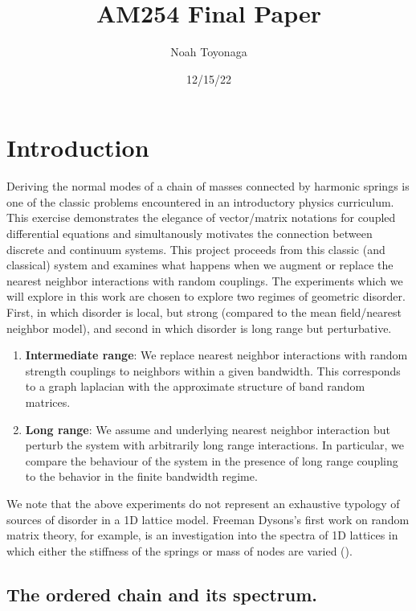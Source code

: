 \documentclass{article}
\title{AM254 Final Paper}
\author{Noah Toyonaga}
\date{12/15/22}
\begin{document}
\maketitle


\section{Introduction}
Deriving the normal modes of a chain of masses connected by harmonic springs is one of the 
classic problems encountered in an introductory physics curriculum.
This exercise demonstrates the elegance of 
vector/matrix notations for coupled differential equations 
and simultanously motivates the connection between discrete and continuum systems. 
This project proceeds from this classic (and classical) system
and examines what happens when we augment or replace the nearest neighbor interactions with random couplings. 
The experiments which we will explore in this work are chosen to explore two regimes of geometric disorder. 
First, in which disorder is local, but strong (compared to the mean field/nearest neighbor model), and second in which disorder is long range but perturbative. 

\begin{enumerate}
	\item \textbf{Intermediate range}: We replace nearest neighbor interactions with random strength couplings to
		neighbors within a given bandwidth. 
		This corresponds to a graph laplacian with the approximate structure of band random matrices. 
	\item \textbf{Long range}: We assume and underlying nearest neighbor interaction but perturb the system with arbitrarily long range interactions.
		In particular, we compare the behaviour of the system in the presence of long range coupling to the behavior in the finite bandwidth regime. 
\end{enumerate}

We note that the above experiments do not represent an exhaustive typology of sources of disorder in a 1D lattice model. 
Freeman Dysons's first work on random matrix theory, for example,
is an investigation into the spectra
of 1D lattices in which either the stiffness of the springs or mass of nodes are varied (\cite{Dyson1953-oa,Forrester2021-xr}). 

\subsection{The ordered chain and its spectrum.}
\end{document}
